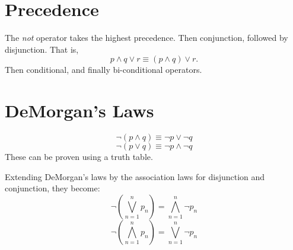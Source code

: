 \section{Precedence}

The \emph{not} operator takes the highest precedence.
Then conjunction, followed by disjunction. That is,
\[ p \land q \lor r \equiv (p \land q) \lor r \text{.}\]
Then conditional, and finally bi-conditional operators.
\begin{table}[H]
  \centering
  \caption{Logical operator precedence.}
\end{table}
\section{DeMorgan's Laws}

\begin{equation}
  \neg (p \land q) \equiv \neg p \lor \neg q
\end{equation}
\begin{equation}
  \neg(p \lor q) \equiv \neg p \land \neg q
\end{equation}
These can be proven using a truth table.
\begin{table}[H]
  \centering
  \caption{A proof of DeMorgan's first law.}
\end{table}

Extending DeMorgan's laws by the association laws for disjunction and conjunction, they become:
\begin{equation}
 \neg\left(\bigvee^n_{n=1} p_n\right)=\bigwedge^n_{n=1} \neg p_n
\end{equation}
\begin{equation}
 \neg\left(\bigwedge^n_{n=1} p_n\right)=\bigvee^n_{n=1} \neg p_n
\end{equation}

